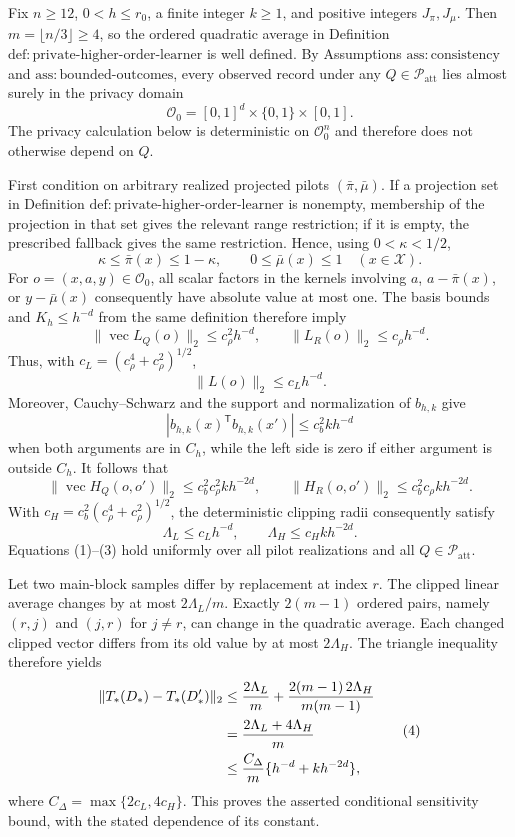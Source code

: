 Fix \(n\ge 12\), \(0<h\le r_0\), a finite integer \(k\ge1\), and positive integers \(J_\pi,J_\mu\).  Then \(m=\lfloor n/3\rfloor\ge4\), so the ordered quadratic average in Definition \(\mathrm{def{:}private\text{-}higher\text{-}order\text{-}learner}\) is well defined.  By Assumptions \(\mathrm{ass{:}consistency}\) and \(\mathrm{ass{:}bounded\text{-}outcomes}\), every observed record under any \(Q\in\mathcal P_{\mathrm{att}}\) lies almost surely in the privacy domain
\[
 \mathcal O_0=[0,1]^d\times\{0,1\}\times[0,1].
\]
The privacy calculation below is deterministic on \(\mathcal O_0^n\) and therefore does not otherwise depend on \(Q\).

First condition on arbitrary realized projected pilots \((\bar\pi,\bar\mu)\).  If a projection set in Definition \(\mathrm{def{:}private\text{-}higher\text{-}order\text{-}learner}\) is nonempty, membership of the projection in that set gives the relevant range restriction; if it is empty, the prescribed fallback gives the same restriction.  Hence, using \(0<\kappa<1/2\),
\[
 \kappa\le \bar\pi(x)\le1-\kappa,
 \qquad 0\le\bar\mu(x)\le1
 \quad (x\in\mathcal X).
\tag{1}
\]
For \(o=(x,a,y)\in\mathcal O_0\), all scalar factors in the kernels involving \(a\), \(a-\bar\pi(x)\), or \(y-\bar\mu(x)\) consequently have absolute value at most one.  The basis bounds and \(K_h\le h^{-d}\) from the same definition therefore imply
\[
 \|\operatorname{vec}L_Q(o)\|_2\le c_\rho^2h^{-d},
 \qquad
 \|L_R(o)\|_2\le c_\rho h^{-d}.
\]
Thus, with \(c_L=(c_\rho^4+c_\rho^2)^{1/2}\),
\[
 \|L(o)\|_2\le c_Lh^{-d}.
\tag{2}
\]
Moreover, Cauchy--Schwarz and the support and normalization of \(b_{h,k}\) give
\[
 |b_{h,k}(x)^{\mathsf T}b_{h,k}(x')|
 \le c_b^2kh^{-d}
\]
when both arguments are in \(C_h\), while the left side is zero if either argument is outside \(C_h\).  It follows that
\[
 \|\operatorname{vec}H_Q(o,o')\|_2
 \le c_b^2c_\rho^2kh^{-2d},
 \qquad
 \|H_R(o,o')\|_2
 \le c_b^2c_\rho kh^{-2d}.
\]
With \(c_H=c_b^2(c_\rho^4+c_\rho^2)^{1/2}\), the deterministic clipping radii consequently satisfy
\[
 \Lambda_L\le c_Lh^{-d},
 \qquad
 \Lambda_H\le c_Hkh^{-2d}.
\tag{3}
\]
Equations (1)--(3) hold uniformly over all pilot realizations and all \(Q\in\mathcal P_{\mathrm{att}}\).

Let two main-block samples differ by replacement at index \(r\).  The clipped linear average changes by at most \(2\Lambda_L/m\).  Exactly \(2(m-1)\) ordered pairs, namely \((r,j)\) and \((j,r)\) for \(j\ne r\), can change in the quadratic average.  Each changed clipped vector differs from its old value by at most \(2\Lambda_H\).  The triangle inequality therefore yields
\[
 \begin{aligned}
 \|T_*(D_*)-T_*(D_*')\|_2
 &\le {2\Lambda_L\over m}
   +{2(m-1)\,2\Lambda_H\over m(m-1)}\\
 &= {2\Lambda_L+4\Lambda_H\over m}\\
 &\le {C_\Delta\over m}\{h^{-d}+kh^{-2d}\},
 \end{aligned}
\tag{4}
\]
where \(C_\Delta=\max\{2c_L,4c_H\}\).  This proves the asserted conditional sensitivity bound, with the stated dependence of its constant.

